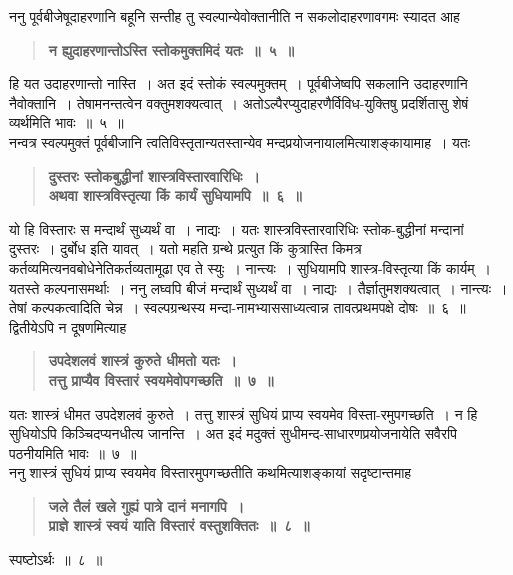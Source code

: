 \documentclass[11pt, openany]{book}
\begin{document}
\begin{sloppypar}
{\small ननु पूर्वबीजेषूदाहरणानि बहूनि सन्तीह तु स्वल्पान्येवोक्तानीति न सकलोदाहरणावगमः स्यादत आह\textendash }

 \label{12.5}
\begin{quote}
{\large \textbf{{\color{purple}न ह्युदाहरणान्तोऽस्ति स्तोकमुक्तमिदं यतः~॥~५~॥}}}
\end{quote}

हि यत उदाहरणान्तो नास्ति~। अत इदं स्तोकं स्वल्पमुक्तम्~। पूर्वबीजेष्वपि सकलानि उदाहरणानि नैवोक्तानि~। तेषामनन्तत्वेन वक्तुमशक्यत्वात्~। अतोऽल्पैरप्युदाहरणैर्विविध-युक्तिषु प्रदर्शितासु शेषं व्यर्थमिति भावः~॥~५~॥\\

{\small नन्वत्र स्वल्पमुक्तं पूर्वबीजानि त्वतिविस्तृतान्यतस्तान्येव मन्दप्रयोजनायालमित्याशङ्कायामाह~। यतः\textendash }

 \label{12.6}
\begin{quote}
{\large \textbf{{\color{purple}दुस्तरः स्तोकबुद्धीनां शास्त्रविस्तारवारिधिः~।\\
अथवा शास्त्रविस्तृत्या किं कार्यं सुधियामपि~॥~६~॥}}}
\end{quote}

यो हि विस्तारः स मन्दार्थं सुध्यर्थं वा~। नाद्यः~। यतः शास्त्रविस्तारवारिधिः स्तोक-बुद्धीनां मन्दानां दुस्तरः~। दुर्बोध इति यावत्~। यतो महति ग्रन्थे प्रत्युत किं कुत्रास्ति किमत्र कर्तव्यमित्यनवबोधेनेतिकर्तव्यतामूढा एव ते स्युः~। नान्त्यः~। सुधियामपि शास्त्र-विस्तृत्या किं कार्यम्~। यतस्ते कल्पनासमर्थाः~। ननु लघ्वपि बीजं मन्दार्थं सुध्यर्थं वा~। नाद्यः~। तैर्ज्ञातुमशक्यत्वात्~। नान्त्यः~। तेषां कल्पकत्वादिति चेन्न~। स्वल्पग्रन्थस्य मन्दा-नामभ्याससाध्यत्वान्न तावत्प्रथमपक्षे दोषः~॥~६~॥\\

{\small द्वितीयेऽपि न दूषणमित्याह\textendash }

 \label{12.7}
\begin{quote}
{\large \textbf{{\color{purple}उपदेशलवं शास्त्रं कुरुते धीमतो यतः~।\\
तत्तु प्राप्यैव विस्तारं स्वयमेवोपगच्छति~॥~७~॥}}}
\end{quote}

यतः शास्त्रं धीमत उपदेशलवं कुरुते~। तत्तु शास्त्रं सुधियं प्राप्य स्वयमेव विस्ता-रमुपगच्छति~। न हि सुधियोऽपि किञ्चिदप्यनधीत्य जानन्ति~। अत इदं मदुक्तं सुधीमन्द-साधारणप्रयोजनायेति सवैरपि पठनीयमिति भावः~॥~७~॥\\ 

{\small ननु शास्त्रं सुधियं प्राप्य स्वयमेव विस्तारमुपगच्छतीति कथमित्याशङ्कायां सदृष्टान्तमाह\textendash }

 \label{12.8}
\begin{quote}
{\large \textbf{{\color{purple}जले तैलं खले गुह्यं पात्रे दानं मनागपि~।\\
प्राज्ञे शास्त्रं स्वयं याति विस्तारं वस्तुशक्तितः~॥~८~॥}}}
\end{quote}

स्पष्टोऽर्थः~॥~८~॥
\end{sloppypar}
\end{document}
